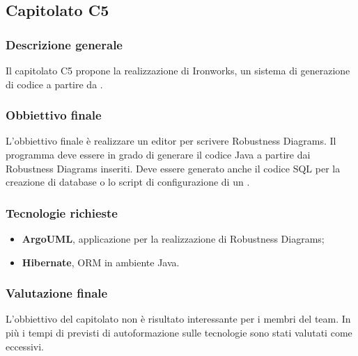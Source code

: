 \subsection{Capitolato C5}

\subsubsection{Descrizione generale}
Il capitolato C5 propone la realizzazione di Ironworks, un sistema di generazione di codice a partire da .

\subsubsection{Obbiettivo finale}
L'obbiettivo finale è realizzare un editor per scrivere Robustness Diagrams. 
Il programma deve essere in grado di generare il codice Java a partire dai Robustness Diagrams inseriti.
Deve essere generato anche il codice SQL per la creazione di database o lo script di configurazione di un .

\subsubsection{Tecnologie richieste}
\begin{itemize}
\item \textbf{ArgoUML}, applicazione per la realizzazione di Robustness Diagrams;
\item \textbf{Hibernate}, ORM in ambiente Java.
\end{itemize}

\subsubsection{Valutazione finale}
L'obbiettivo del capitolato non è risultato interessante per i membri del team.
In più i tempi di previsti di autoformazione sulle tecnologie sono stati valutati come eccessivi.
